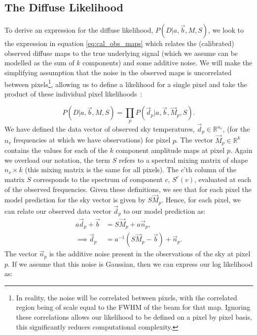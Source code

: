 \documentclass[fleqn,usenatbib]{mnras}
\begin{document}
\subsection{The Diffuse Likelihood}
To derive an expression for the diffuse likelihood, $P(D| a,\Vec{b},M,S)$, we look to the expression in equation \ref{eq:cal_obs_maps} which relates the (calibrated) observed diffuse maps to the true underlying signal (which we assume can be modelled as the sum of $k$ components) and some additive noise. We will make the simplifying assumption that the noise in the observed maps is uncorrelated between pixels\footnote{In reality, the noise will be correlated between pixels, with the correlated region being of scale equal to the FWHM of the beam for that map. Ignoring these correlations allows our likelihood to be defined on a pixel by pixel basis, this significantly reduces computational complexity.}, allowing us to define a likelihood for a single pixel and take the product of these individual pixel likelihoods~\citep{Stompor2009}:

\begin{equation}
    \label{the diffuse total likelihood term}
    P(D|a,\Vec{b},M,S) = \prod_p P(\Vec{d}_p|a,\Vec{b},\Vec{M}_p,S).
\end{equation}
We have defined the data vector of observed sky temperatures, $\Vec{d}_p \in \mathbb{R}^{n_v}$, (for the $n_v$ frequencies at which we have observations) for pixel $p$. The vector $\Vec{M}_p\in \mathbb{R}^k$ contains the values for each of the $k$ component amplitude maps at pixel $p$. Again we overload our notation, the term $S$ refers to a spectral mixing matrix of shape $n_v\times k$ (this mixing matrix is the same for all pixels). The $c$'th column of the matrix $S$ corresponds to the spectrum of component $c$, $S^c(v)$, evaluated at each of the observed frequencies. Given these definitions, we see that for each pixel the model prediction for the sky vector is given by $S\Vec{M}_p$. Hence, for each pixel, we can relate our observed data vector $\Vec{d}_p$ to our model prediction as:
\begin{equation}
\begin{aligned}
    a\Vec{d}_p +\Vec{b} &= S\Vec{M}_p + a\Vec{n}_p, \\
    \implies \Vec{d}_p &= a^{-1}\left(S\Vec{M}_p - \Vec{b}\right) + \Vec{n}_p. 
\end{aligned}
\end{equation}
The vector $\Vec{n}_p$ is the additive noise present in the observations of the sky at pixel $p$. If we assume that this noise is Gaussian, then we can express our log likelihood as:
\end{document}
